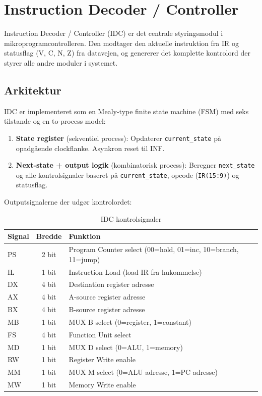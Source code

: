 \documentclass{article}
\begin{document}
\fi

\section{Instruction Decoder / Controller}
\label{sec:idc}

Instruction Decoder / Controller (IDC) er det centrale styringsmodul i mikroprogramcontrolleren.
Den modtager den aktuelle instruktion fra IR og statusflag (V, C, N, Z) fra datavejen,
og genererer det komplette kontrolord der styrer alle andre moduler i systemet.

\subsection{Arkitektur}
\label{sec:idc-arch}

IDC er implementeret som en Mealy-type finite state machine (FSM) med seks tilstande
og en to-process model:

\begin{enumerate}
    \item \textbf{State register} (sekventiel process): Opdaterer \texttt{current\_state} på opadgående
          clockflanke. Asynkron reset til INF.
    \item \textbf{Next-state + output logik} (kombinatorisk process): Beregner \texttt{next\_state}
          og alle kontrolsignaler baseret på \texttt{current\_state}, opcode (\texttt{IR(15:9)}) og statusflag.
\end{enumerate}

Outputsignalerne der udgør kontrolordet:

\begin{table}[H]
\centering
\begin{tabular}{|l|c|l|}
\hline
\textbf{Signal} & \textbf{Bredde} & \textbf{Funktion} \\
\hline
PS  & 2 bit  & Program Counter select (00=hold, 01=inc, 10=branch, 11=jump) \\
IL  & 1 bit  & Instruction Load (load IR fra hukommelse) \\
DX  & 4 bit  & Destination register adresse \\
AX  & 4 bit  & A-source register adresse \\
BX  & 4 bit  & B-source register adresse \\
MB  & 1 bit  & MUX B select (0=register, 1=constant) \\
FS  & 4 bit  & Function Unit select \\
MD  & 1 bit  & MUX D select (0=ALU, 1=memory) \\
RW  & 1 bit  & Register Write enable \\
MM  & 1 bit  & MUX M select (0=ALU adresse, 1=PC adresse) \\
MW  & 1 bit  & Memory Write enable \\
\hline
\end{tabular}
\caption{IDC kontrolsignaler}
\label{tab:idc-signals}
\end{table}
\end{document}
